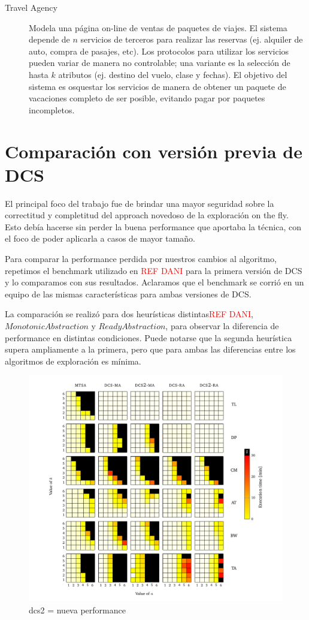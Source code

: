 \begin{description}
    \item [Travel Agency] Modela una página on-line de ventas de paquetes de viajes. El sistema depende de $n$ servicios de terceros para realizar las reservas (ej. alquiler de auto, compra de pasajes, etc). Los protocolos para utilizar los servicios pueden variar de manera no controlable; una variante es la selección de hasta $k$ atributos (ej. destino del vuelo, clase y fechas). El objetivo del sistema es osquestar los servicios de manera de obtener un paquete de vacaciones completo de ser posible, evitando pagar por paquetes incompletos.
\end{description}

\section{Comparación con versión previa de DCS}
El principal foco del trabajo fue de brindar una mayor seguridad sobre la correctitud y completitud del approach novedoso de la exploración on the fly. Esto debía hacerse sin perder la buena performance que aportaba la técnica, con el foco de poder aplicarla a casos de mayor tamaño.

Para comparar la performance perdida por nuestros cambios al algoritmo, repetimos el benchmark utilizado en \textcolor{red}{REF DANI} para la primera versión de DCS y lo comparamos con sus resultados. Aclaramos que el benchmark se corrió en un equipo de las mismas características para ambas versiones de DCS.

La comparación se realizó para dos heurísticas distintas\textcolor{red}{REF DANI}, $Monotonic Abstraction$ y $Ready Abstraction$, para observar la diferencia de performance en distintas condiciones. Puede notarse que la segunda heurística supera ampliamente a la primera, pero que para ambas las diferencias entre los algoritmos de exploración es mínima.

\begin{figure}[htb]
    \centering
    \includegraphics[width=\linewidth]{figures/dcs_vs.pdf}  
    \caption{dcs2 = nueva performance}
    \label{fig:dcs_vs}
\end{figure}



